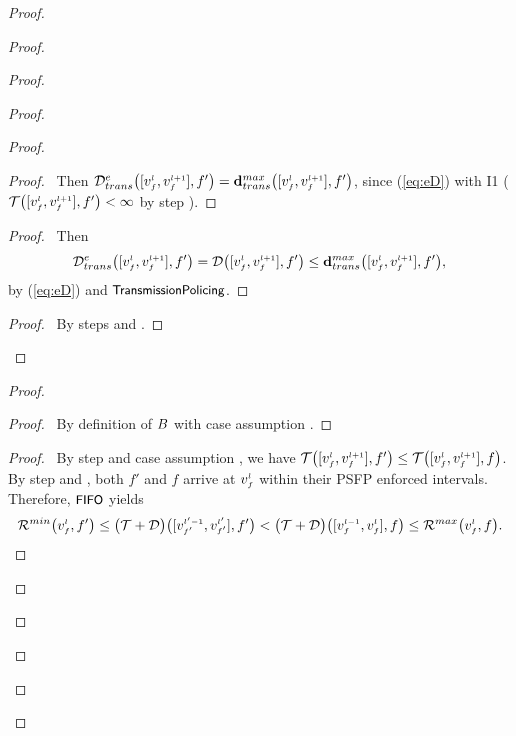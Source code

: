 \begin{proof}
\begin{proof}
\begin{proof}
\begin{proof}
\begin{proof}
                    \begin{proof}
		      \pf\ Then $\eDtrans{\clink{l}{f}, f'} = \dpdbtransmax{\clink{l}{f}, f'}$, since (\ref{eq:eD}) with I1 ($\T{\clink{l}{f},f'} < \infty$ by step ).
                    \end{proof}
                    \begin{proof}
                	\pf\ Then 
                	\begin{equation*}
			  \eDtrans{\clink{l}{f}, f'} = \D{\clink{l}{f}, f'} \leq \dpdbtransmax{\clink{l}{f}, f'},  
                	\end{equation*}
                	 by (\ref{eq:eD}) and $\TP$.
                    \end{proof}
                    \qedstep
                    \begin{proof}
                	\pf\ By steps  and .
                    \end{proof}
                \end{proof}
                \begin{proof}
                    \begin{proof}
		      \pf\ By definition of $\I{}$ with case assumption . 
                    \end{proof}
                    \begin{proof}
		      \pf\ By step  and case assumption , we have $\T{\clink{l}{f},f'} \leq \T{\clink{l}{f},f}$.
			By step  and , both $f'$ and $f$ arrive at $\v{l}{f}$ within their PSFP enforced intervals.
                	Therefore, $\FIFO$ yields
                	\begin{equation*}
			  \Rmin{\v{l}{f}, f'} \leq \add{\T}{\D}{\pclink{l'}{f'},f'} < \add{\T}{\D}{\pclink{l}{f},f} \leq \Rmax{\v{l}{f},f}.
                	\end{equation*}

\end{proof}
\end{proof}
\end{proof}
\end{proof}
\end{proof}
\end{proof}
